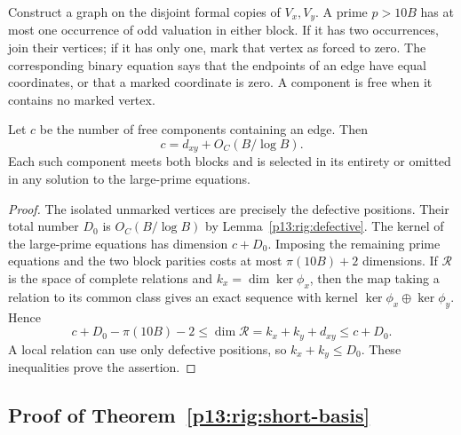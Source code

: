 Construct a graph on the disjoint formal copies of $V_x,V_y$.
A prime $p>10B$ has at most one occurrence of odd valuation
in either block.  If it has two occurrences, join their vertices;
if it has only one, mark that vertex as forced to zero.
The corresponding binary equation says that the endpoints of
an edge have equal coordinates, or that a marked coordinate is
zero.  A component is free when it contains no marked vertex.

\begin{lemma}
\label{p13:rig:components}
Let $c$ be the number of free components containing an edge.
Then
\[
                         c=d_{xy}+O_C(B/\log B).
\]
Each such component meets both blocks and is selected in its
entirety or omitted in any solution to the large-prime equations.
\end{lemma}

\begin{proof}
The isolated unmarked vertices are precisely the defective
positions.  Their total number $D_0$ is $O_C(B/\log B)$ by
Lemma~\ref{p13:rig:defective}.  The kernel of the large-prime
equations has dimension $c+D_0$.  Imposing the remaining
prime equations and the two block parities costs at most
$\pi(10B)+2$ dimensions.  If $\mathcal R$ is the space of
complete relations and $k_x=\dim\ker\phi_x$, then the map
taking a relation to its common class gives an exact sequence
with kernel $\ker\phi_x\oplus\ker\phi_y$.  Hence
\[
 c+D_0-\pi(10B)-2\le\dim\mathcal R=k_x+k_y+d_{xy}
                                      \le c+D_0.
\]
A local relation can use only defective positions, so
$k_x+k_y\le D_0$.  These inequalities prove the assertion.
\end{proof}


\subsection{Proof of Theorem~\ref{p13:rig:short-basis}}
\label{p14:comp:rigidity:short-basis}

